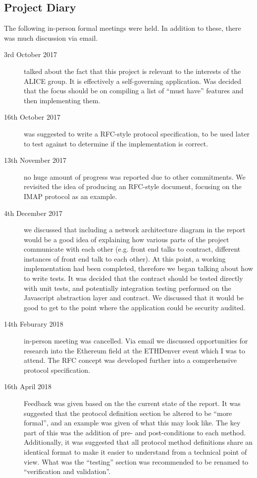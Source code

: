 \subsection*{Project Diary}

The following in-person formal meetings were held. In addition to these, there was much discussion via email.

\begin{description}
    \item [3rd October 2017] talked about the fact that this project is relevant to the interests of the ALICE group. It is effectively a self-governing application. Was decided that the focus should be on compiling a list of ``must have'' features and then implementing them.
    \item [16th October 2017] was suggested to write a RFC-style protocol specification, to be used later to test against to determine if the implementation is correct.
    \item [13th November 2017] no huge amount of progress was reported due to other commitments. We revisited the idea of producing an RFC-style document, focusing on the IMAP protocol as an example.
    \item [4th December 2017] we discussed that including a network architecture diagram in the report would be a good idea of explaining how various parts of the project communicate with each other (e.g. front end talks to contract, different instances of front end talk to each other). At this point, a working implementation had been completed, therefore we began talking about how to write tests. It was decided that the contract should be tested directly with unit tests, and potentially integration testing performed on the Javascript abstraction layer and contract. We discussed that it would be good to get to the point where the application could be security audited.
    \item [14th Feburary 2018] in-person meeting was cancelled. Via email we discussed opportunities for research into the Ethereum field at the ETHDenver event which I was to attend. The RFC concept was developed further into a comprehensive protocol specification.
    \item [16th April 2018] Feedback was given based on the the current state of the report. It was suggested that the protocol definition section be altered to be \enquote{more formal}, and an example was given of what this may look like. The key part of this was the addition of pre- and post-conditions to each method. Additionally, it was suggested that all protocol method definitions share an identical format to make it easier to understand from a technical point of view. What was the \enquote{testing} section was recommended to be renamed to \enquote{verification and validation}.
\end{description}
